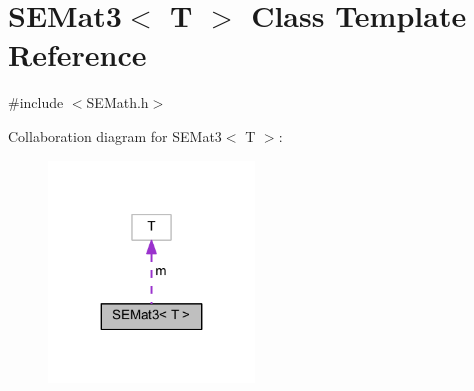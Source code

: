 \section{S\+E\+Mat3$<$ T $>$ Class Template Reference}
\label{class_s_e_mat3}


{\ttfamily \#include $<$S\+E\+Math.\+h$>$}



Collaboration diagram for S\+E\+Mat3$<$ T $>$\+:
\nopagebreak
\begin{figure}[H]
\begin{center}
\leavevmode
\includegraphics[width=155pt]{class_s_e_mat3__coll__graph}
\end{center}
\end{figure}
